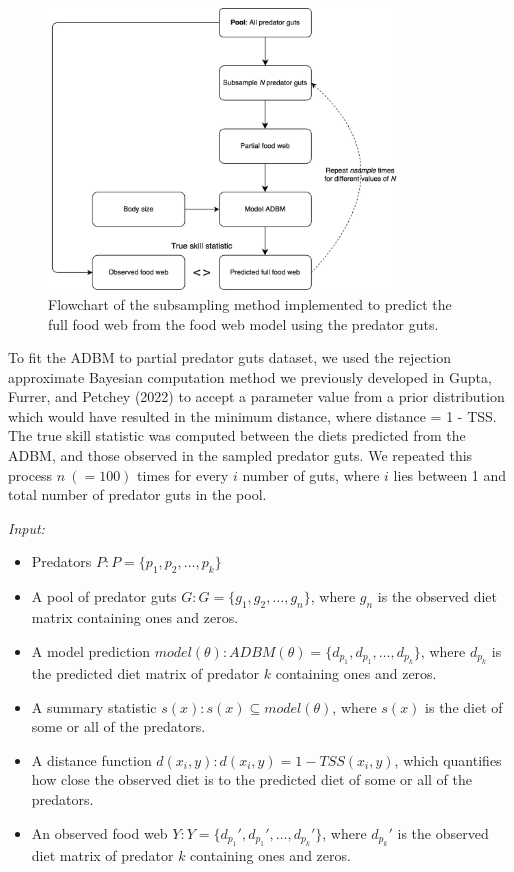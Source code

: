 \documentclass{article}
\begin{document}
\begin{figure}

{\centering \includegraphics[width=350px]{../../manuscript/fig/ms_C2_flowchart} 

}

\caption{\label{fig:fig_ra} Flowchart of the subsampling method implemented to predict the full food web from the food web model using the predator guts.}\label{fig:unnamed-chunk-2}
\end{figure}

To fit the ADBM to partial predator guts dataset, we used the rejection
approximate Bayesian computation method we previously developed in
Gupta, Furrer, and Petchey (2022) to accept a parameter value from a
prior distribution which would have resulted in the minimum distance,
where distance = 1 - TSS. The true skill statistic was computed between
the diets predicted from the ADBM, and those observed in the sampled
predator guts. We repeated this process \(n~(= 100)\) times for every
\(i\) number of guts, where \(i\) lies between 1 and total number of
predator guts in the pool.

\emph{Input:}

\begin{itemize}
\item
  Predators \(P: P = \{p_1, p_2, \dots, p_k \}\)
\item
  A pool of predator guts \(G: G = \{g_1, g_2, \dots, g_n\}\), where
  \(g_{n}\) is the observed diet matrix containing ones and zeros.
\item
  A model prediction
  \(model(\theta): ADBM(\theta) = \{d_{p_1}, d_{p_1}, \dots, d_{p_k}\}\),
  where \(d_{p_k}\) is the predicted diet matrix of predator \(k\)
  containing ones and zeros.
\item
  A summary statistic \(s(x): s(x) \subseteq model(\theta)\), where
  \(s(x)\) is the diet of some or all of the predators.
\item
  A distance function \(d(x_i, y) : d(x_i,y) = 1 - TSS(x_i, y)\), which
  quantifies how close the observed diet is to the predicted diet of
  some or all of the predators.
\item
  An observed food web
  \(Y: Y = \{d_{p_1}', d_{p_1}', \dots, d_{p_k}'\}\), where \(d_{p_k}'\)
  is the observed diet matrix of predator \(k\) containing ones and
  zeros.
\end{itemize}
\end{document}
